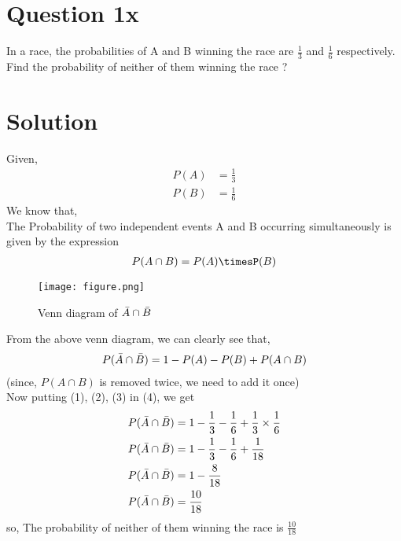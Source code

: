 \documentclass[journal,12pt,twocolumn]{IEEEtran}
\begin{document}
\maketitle

\section{Question 1x}
In a race, the probabilities of A and B winning the race are $\frac{1}{3}$ and $\frac{1}{6}$ respectively. Find the probability of neither of them winning the race ?
\section{Solution}
Given, \\
\begin{align}
    P(A) &= \frac{1}{3}\\
    P(B) &= \frac{1}{6}
\end{align}
We know that,\\
The Probability of two independent events A and B occurring simultaneously
is given by the expression\\
\begin{align}
     P(A \cap B) =  P(A)\timesP(B)   
\end{align}

    
   

\begin{figure}[ht]
    \centering
    \texttt{[image: figure.png]}
    \caption{Venn diagram of $\Bar{A}\cap\Bar{B}$}
    \label{fig:my_label}
\end{figure}
From the above venn diagram, we can clearly see that,\\
\begin{align}
   P(\Bar{A} \cap \Bar{B}) = 1 - P(A) - P(B) + P(A \cap B)   
\end{align}
(since, $P(A \cap B)$ is removed twice, we need to add it once)\\
Now putting (1), (2), (3) in (4), we get\\
\begin{align}
     P(\Bar{A} \cap \Bar{B}) &= 1 - \frac{1}{3} - \frac{1}{6} + \frac{1}{3}\times\frac{1}{6}\\
     P(\Bar{A} \cap \Bar{B}) &=   1 - \frac{1}{3} - \frac{1}{6} +\frac{1}{18}\\ 
      P(\Bar{A} \cap \Bar{B}) &=  1 - \frac{8}{18}\\
       P(\Bar{A} \cap \Bar{B}) &= \frac{10}{18}
\end{align}
so, The probability of neither of them winning the race is $\frac{10}{18}$
\end{document}
